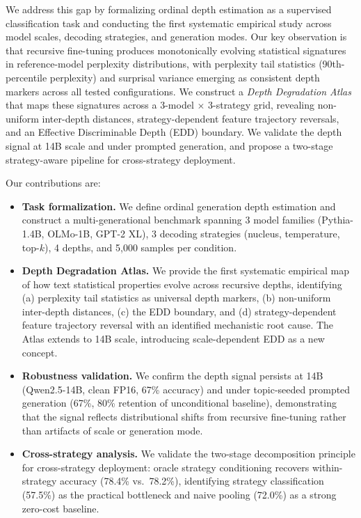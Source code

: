 \documentclass[11pt,a4paper]{article}
\begin{document}
We address this gap by formalizing ordinal depth estimation as a supervised classification task and conducting the first systematic empirical study across model scales, decoding strategies, and generation modes. Our key observation is that recursive fine-tuning produces monotonically evolving statistical signatures in reference-model perplexity distributions, with perplexity tail statistics (90th-percentile perplexity) and surprisal variance emerging as consistent depth markers across all tested configurations. We construct a \emph{Depth Degradation Atlas} that maps these signatures across a 3-model $\times$ 3-strategy grid, revealing non-uniform inter-depth distances, strategy-dependent feature trajectory reversals, and an Effective Discriminable Depth (EDD) boundary. We validate the depth signal at 14B scale and under prompted generation, and propose a two-stage strategy-aware pipeline for cross-strategy deployment.

Our contributions are:
\begin{itemize}
    \item \textbf{Task formalization.} We define ordinal generation depth estimation and construct a multi-generational benchmark spanning 3 model families (Pythia-1.4B, OLMo-1B, GPT-2 XL), 3 decoding strategies (nucleus, temperature, top-$k$), 4 depths, and 5{,}000 samples per condition.
    \item \textbf{Depth Degradation Atlas.} We provide the first systematic empirical map of how text statistical properties evolve across recursive depths, identifying (a) perplexity tail statistics as universal depth markers, (b) non-uniform inter-depth distances, (c) the EDD boundary, and (d) strategy-dependent feature trajectory reversal with an identified mechanistic root cause. The Atlas extends to 14B scale, introducing scale-dependent EDD as a new concept.
    \item \textbf{Robustness validation.} We confirm the depth signal persists at 14B (Qwen2.5-14B, clean FP16, 67\% accuracy) and under topic-seeded prompted generation (67\%, 80\% retention of unconditional baseline), demonstrating that the signal reflects distributional shifts from recursive fine-tuning rather than artifacts of scale or generation mode.
    \item \textbf{Cross-strategy analysis.} We validate the two-stage decomposition principle for cross-strategy deployment: oracle strategy conditioning recovers within-strategy accuracy (78.4\% vs.\ 78.2\%), identifying strategy classification (57.5\%) as the practical bottleneck and naive pooling (72.0\%) as a strong zero-cost baseline.
\end{itemize}
\end{document}
